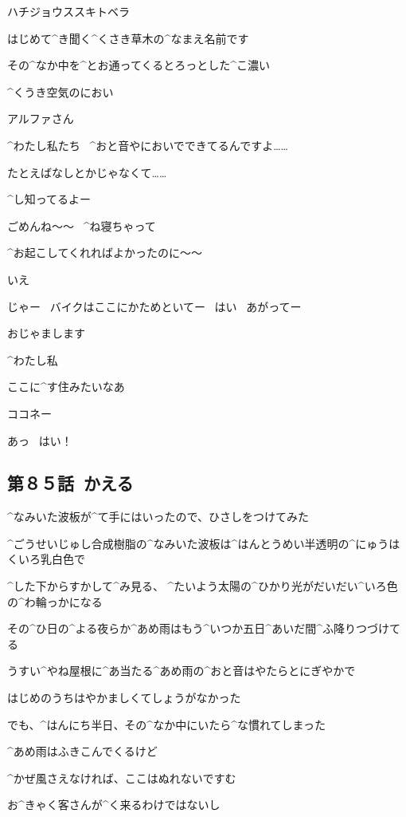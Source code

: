 \page
\K ハチジョウススキトベラ

\K はじめて^{き}{聞}く^{くさき}{草木}の^{なまえ}{名前}です

\K その^{なか}{中}を^{とお}{通}ってくるとろっとした^{こ}{濃}い

\K ^{くうき}{空気}のにおい

\page
\K アルファさん

\K ^{わたし}{私}たち
\ ^{おと}{音}やにおいでできてるんですよ……

\K たとえばなしとかじゃなくて……

\A ^{し}{知}ってるよー

\page[108]
\A ごめんね〜〜
\ ^{ね}{寝}ちゃって

\A ^{お}{起}こしてくれればよかったのに〜〜

\K いえ

\page
\A じゃー
\ バイクはここにかためといてー
\ はい
\ あがってー

\K おじゃまします

\K ^{わたし}{私}

\K ここに^{す}{住}みたいなあ

\page
\A ココネー

\K あっ
\ はい！


\subsection{第８５話\ かえる}

\page[115]
\A ^{なみいた}{波板}が^{て}{手}にはいったので、ひさしをつけてみた

\A ^{ごうせいじゅし}{合成樹脂}の^{なみいた}{波板}は^{はんとうめい}{半透明}の^{にゅうはくいろ}{乳白色}で

\A ^{した}{下}からすかして^{み}{見}る、
^{たいよう}{太陽}の^{ひかり}{光}がだいだい^{いろ}{色}の^{わ}{輪}っかになる

\page
\A その^{ひ}{日}の^{よる}{夜}らか^{あめ}{雨}はもう^{いつか}{五日}^{あいだ}{間}^{ふ}{降}りつづけてる

\A うすい^{やね}{屋根}に^{あ}{当}たる^{あめ}{雨}の^{おと}{音}はやたらとにぎやかで

\A はじめのうちはやかましくてしょうがなかった

\A でも、^{はんにち}{半日}、その^{なか}{中}にいたら^{な}{慣}れてしまった

\page
\A ^{あめ}{雨}はふきこんでくるけど

\A ^{かぜ}{風}さえなければ、ここはぬれないですむ

\page
\A お^{きゃく}{客}さんが^{く}{来}るわけではないし

